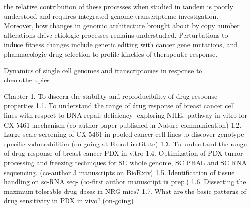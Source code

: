 
 

the relative contribution of these processes when  studied  in  tandem  is  poorly  understood  and  requires  integrated  genome-transcriptome investigation.   Moreover,  how  changes  in  genomic  architecture  brought  about  by  copy  number alterations drive etiologic processes remains understudied. Perturbations to induce fitness changes include genetic editing with cancer gene mutations, and pharmacologic drug selection to profile kinetics of therapeutic response.
















Dynamics of single cell genomes and transcriptomes in response to chemotherapies

Chapter 1. To discern the stability and reproducibility of drug response properties  
1.1. To understand the range of drug response of breast cancer cell lines with respect to DNA repair deficiency- exploring NHEJ pathway in vitro for CX-5461 mechanism-(co-author paper published in Nature communication)
1.2. Large scale screening of CX-5461 in pooled cancer cell lines to discover genotype-specific vulnerabilities (on going at Broad institute)
1.3. To understand the range of drug response of breast cancer PDX in vitro
1.4. Optimization of PDX tumor processing and freezing techniques for SC whole genome, SC PBAL and SC RNA sequencing. (co-author 3 manuscripts on BioRxiv) 
1.5. Identification of tissue handling on sc-RNA seq- (co-first author manuscript in prep.)
1.6. Dissecting the maximum tolerable drug doses in NRG mice?
1.7. What are the basic patterns of drug sensitivity in PDX in vivo? (on-going)


